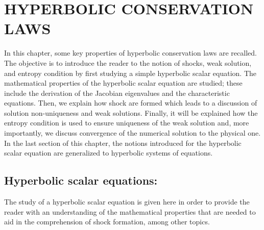 %
%
%

%
\chapter{\uppercase {Hyperbolic conservation laws}}\label{chap:theory_chp1}
%
In this chapter, some key properties of hyperbolic conservation laws are recalled. The objective is to introduce the reader to the notion of shocks, weak solution, and entropy condition by first studying a simple hyperbolic scalar equation. The mathematical properties of the hyperbolic scalar equation are studied; these include the derivation of the Jacobian eigenvalues and the characteristic equations. Then, we explain how shock are formed which leads to a discussion of solution non-uniqueness and weak solutions. Finally, it will be explained how the entropy condition is used to ensure uniqueness of the weak solution and, more importantly, we discuss convergence of the numerical solution to the physical one. In the last section of this chapter, the notions introduced for the hyperbolic scalar equation are generalized to hyperbolic systems of equations.

\section{Hyperbolic scalar equations:}\label{sec:hyp_scalar_sct1b}

The study of a hyperbolic scalar equation is given here in order to provide the reader with an understanding of the  mathematical properties that are needed to aid in the comprehension of shock formation, among other topics.


